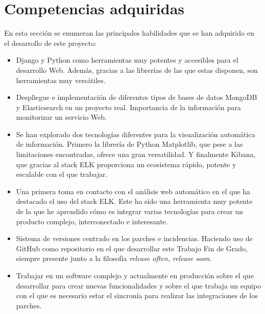 \documentclass[a4paper, 12pt]{book}
\begin{document}
	\section{Competencias adquiridas} 
	\label{sec:competencias_adquiridas} 
	
		En esta sección se enumeran las principales habilidades que se han adquirido en el desarrollo de este proyecto:
		\begin{itemize}
			\item Django y Python como herramientas muy potentes y accesibles para el desarrollo Web. Además, gracias a las librerías de las que estas disponen, son herramientas muy versátiles.\\
			
			\item Despliegue e implementación de diferentes tipos de bases de datos MongoDB y Elasticsearch en un proyecto real. Importancia de la información para monitorizar un servicio Web.\\
			
			\item Se han explorado dos tecnologías diferentes para la visualización automática de información. Primero la librería de Python Matplotlib, que pese a las limitaciones encontradas, ofrece una gran versatilidad. Y finalmente Kibana, que gracias al stack ELK proporciona un ecosistema rápido, potente y escalable con el que trabajar. \\
			
			\item Una primera toma en contacto con el análisis web automático en el que ha destacado el uso del stack ELK. Este ha sido una herramienta muy potente de la que he aprendido cómo es integrar varias tecnologías para crear un producto complejo, interconectado e interesante. \\
			
			
			\item Sistema de versiones centrado en los parches e incidencias. Haciendo uso de GitHub como repositorio en el que desarrollar este Trabajo Fin de Grado, siempre presente junto a la filosofía \textit{release often, release soon}. \\
			
			\item Trabajar en un software complejo y actualmente en producción sobre el que desarrollar para crear nuevas funcionalidades y sobre el que trabaja un equipo con el que es necesario estar el sincronía para realizar las integraciones de los parches. \\
			
		\end{itemize}
\end{document}
